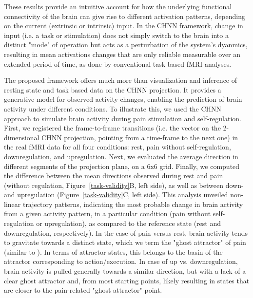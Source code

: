 \documentclass{article}
\begin{document}
These results provide an intuitive account for how the underlying functional connectivity of the brain can give rise to
different activation patterns, depending on the current (extrinsic or intrinsic) input. In the CHNN framework, change in
input (i.e. a task or stimulation) does not simply switch to the brain into a distinct "mode" of operation but acts as
a perturbation of the system's dyanmics, resulting in mean activations changes that are only reliable measurable over
an extended period of time, as done by conventional task-based fMRI analyses.

The proposed framework offers much more than visualization and inference of resting state and task based data on the
CHNN projection. It provides a generative model for observed activity changes, enabling the prediction of brain
activity under different conditions. To illustrate this, we used the CHNN approach to simulate brain activity during pain
stimulation and self-regulation. First, we registered the frame-to-frame transitions (i.e. the vector on the 2-dimensional CHNN projection, pointing from a time-frame to the next one) in the real fMRI data for all four
conditions: rest, pain without self-regulation, downregulation, and upregulation.
Next, we evaluated the average direction in different segments of the projection plane, on a 6x6 grid. Finally, we
computed the difference between the mean directions observed during rest and pain (without regulation,
Figure~\ref{task-validity}B, left side), as well as between down- and upregulation (Figure~\ref{task-validity}C, left side).
This analysis unveiled non-linear trajectory patterns, indicating the most probable change in brain activity from a
given activity pattern, in a particular condition (pain without self-regulation or upregulation), as
compared to the reference state (rest and downregulation, respectively). In the case of pain versus rest, brain
activity tends to gravitate towards a distinct state, which we term the "ghost attractor" of pain (similar to \cite{vohryzek2020ghost}). In terms of attractor states, this belongs to the basin of the
attractor corresponding to action/execution. In case of up vs. downregulation, brain activity is pulled generally
towards a similar direction, but with a lack of a clear ghost attractor and, from most starting points, likely resulting in states that are closer to the pain-related "ghost attractor" point.
\end{document}
